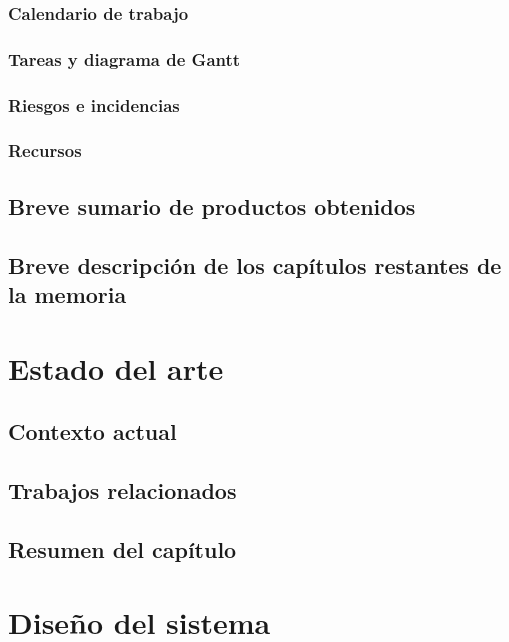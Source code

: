 \documentclass[12pt]{article}
\begin{document}
	\subsubsection[Calendario de trabajo]{Calendario de trabajo}
	\subsubsection[Tareas y diagrama de Gantt]{Tareas y diagrama de Gantt}
	\subsubsection[Riesgos e incidencias]{Riesgos e incidencias}
	\subsubsection[Recursos]{Recursos}
	\subsection[Breve sumario de productos obtenidos]{Breve sumario de productos obtenidos}
	\subsection[Breve descripción de los capítulos restantes de la memoria]{Breve descripción de los capítulos restantes de la memoria}
	
	\pagebreak
	
	\section[Estado del arte]{Estado del arte}  
	
	\subsection[Contexto actual]{Contexto actual}
	
	\subsection[Trabajos relacionados]{Trabajos relacionados}
	\subsection[Resumen del capítulo]{Resumen del capítulo}
	
	\pagebreak
	
	\section[Diseño del sistema]{Diseño del sistema}
\end{document}
